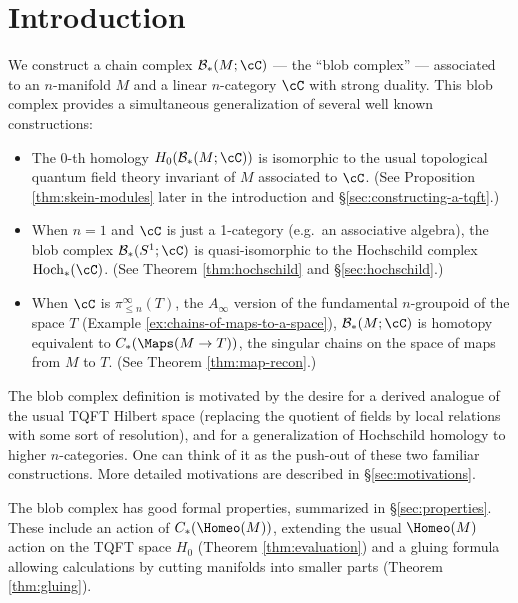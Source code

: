
\section{Introduction}

We construct a chain complex $\bc_*(M; \cC)$ --- the ``blob complex'' --- 
associated to an $n$-manifold $M$ and a linear $n$-category $\cC$ with strong duality.
This blob complex provides a simultaneous generalization of several well known constructions:
\begin{itemize}
\item The 0-th homology $H_0(\bc_*(M; \cC))$ is isomorphic to the usual 
topological quantum field theory invariant of $M$ associated to $\cC$.
(See Proposition \ref{thm:skein-modules} later in the introduction and \S \ref{sec:constructing-a-tqft}.)
\item When $n=1$ and $\cC$ is just a 1-category (e.g.\ an associative algebra), 
the blob complex $\bc_*(S^1; \cC)$ is quasi-isomorphic to the Hochschild complex $\HC_*(\cC)$.
(See Theorem \ref{thm:hochschild} and \S \ref{sec:hochschild}.)
\item When $\cC$ is $\pi^\infty_{\leq n}(T)$, the $A_\infty$ version of the fundamental $n$-groupoid of
the space $T$ (Example \ref{ex:chains-of-maps-to-a-space}), 
$\bc_*(M; \cC)$ is homotopy equivalent to $C_*(\Maps(M\to T))$,
the singular chains on the space of maps from $M$ to $T$.
(See Theorem \ref{thm:map-recon}.)
\end{itemize}

The blob complex definition is motivated by the desire for a derived analogue of the usual TQFT Hilbert space 
(replacing the quotient of fields by local relations with some sort of resolution), 
and for a generalization of Hochschild homology to higher $n$-categories.
One can think of it as the push-out of these two familiar constructions.
More detailed motivations are described in \S \ref{sec:motivations}.

The blob complex has good formal properties, summarized in \S \ref{sec:properties}.
These include an action of $\CH{M}$, 
extending the usual $\Homeo(M)$ action on the TQFT space $H_0$ (Theorem \ref{thm:evaluation}) and a gluing 
formula allowing calculations by cutting manifolds into smaller parts (Theorem \ref{thm:gluing}).

